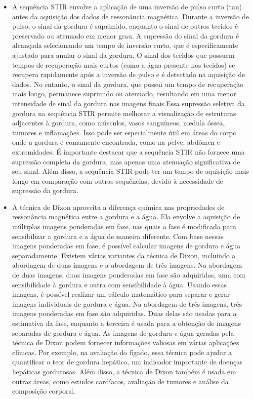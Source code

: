\documentclass[11pt,a4paper]{article}
\newcounter{exemplo}
\begin{document}
\begin{exemplo}
\begin{itemize}
        \begin{itemize}[label=\textcolor{CarnationPink}{$\blacktriangleright$}]
            \item A sequência STIR envolve a aplicação de uma inversão de pulso curto (tau) antes da aquisição dos dados de ressonância magnética. Durante a inversão de pulso, o sinal da gordura é suprimido, enquanto o sinal de outros tecidos é preservado ou atenuado em menor grau. A supressão do sinal da gordura é alcançada selecionando um tempo de inversão curto, que é especificamente ajustado para anular o sinal da gordura. O sinal dos tecidos que possuem tempos de recuperação mais curtos (como a água presente nos tecidos) se recupera rapidamente após a inversão de pulso e é detectado na aquisição de dados. No entanto, o sinal da gordura, que possui um tempo de recuperação mais longo, permanece suprimido ou atenuado, resultando em uma menor intensidade de sinal da gordura nas imagens finais.Essa supressão seletiva da gordura na sequência STIR permite melhorar a visualização de estruturas adjacentes à gordura, como músculos, vasos sanguíneos, medula óssea, tumores e inflamações. Isso pode ser especialmente útil em áreas do corpo onde a gordura é comumente encontrada, como na pelve, abdômen e extremidades. É importante destacar que a sequência STIR não fornece uma supressão completa da gordura, mas apenas uma atenuação significativa de seu sinal. Além disso, a sequência STIR pode ter um tempo de aquisição mais longo em comparação com outras sequências, devido à necessidade de supressão da gordura.
            
            \item A técnica de Dixon aproveita a diferença química nas propriedades de ressonância magnética entre a gordura e a água. Ela envolve a aquisição de múltiplas imagens ponderadas em fase, nas quais a fase é modificada para sensibilizar a gordura e a água de maneira diferente. Com base nessas imagens ponderadas em fase, é possível calcular imagens de gordura e água separadamente. Existem várias variantes da técnica de Dixon, incluindo a abordagem de duas imagens e a abordagem de três imagens. Na abordagem de duas imagens, duas imagens ponderadas em fase são adquiridas, uma com sensibilidade à gordura e outra com sensibilidade à água. Usando essas imagens, é possível realizar um cálculo matemático para separar e gerar imagens individuais de gordura e água. Na abordagem de três imagens, três imagens ponderadas em fase são adquiridas. Duas delas são usadas para a estimativa da fase, enquanto a terceira é usada para a obtenção de imagens separadas de gordura e água. As imagens de gordura e água geradas pela técnica de Dixon podem fornecer informações valiosas em várias aplicações clínicas. Por exemplo, na avaliação do fígado, essa técnica pode ajudar a quantificar o teor de gordura hepática, um indicador importante de doenças hepáticas gordurosas. Além disso, a técnica de Dixon também é usada em outras áreas, como estudos cardíacos, avaliação de tumores e análise da composição corporal.
            

\end{itemize}
\end{itemize}
\end{exemplo}
\end{document}
